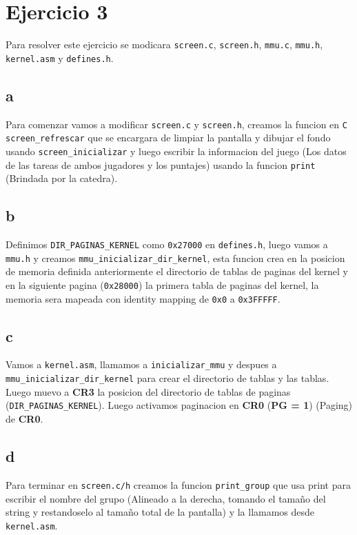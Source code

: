 \section{Ejercicio 3}

Para resolver este ejercicio se modicara \texttt{screen.c}, \texttt{screen.h}, \texttt{mmu.c}, \texttt{mmu.h}, \texttt{kernel.asm} y \texttt{defines.h}.

\subsection{a}
Para comenzar vamos a modificar \texttt{screen.c} y \texttt{screen.h}, creamos la funcion en \texttt{C} \texttt{screen\_refrescar} que se encargara de limpiar la pantalla y dibujar el fondo usando \texttt{screen\_inicializar} y luego escribir la informacion del juego (Los datos de las tareas de ambos jugadores y los puntajes) usando la funcion \texttt{print} (Brindada por la catedra).

\subsection{b}
Definimos \texttt{DIR\_PAGINAS\_KERNEL} como \texttt{0x27000} en \texttt{defines.h}, luego vamos a \texttt{mmu.h} y creamos \texttt{mmu\_inicializar\_dir\_kernel}, esta funcion crea en la posicion de memoria definida anteriormente el directorio de tablas de paginas del kernel y en la siguiente pagina (\texttt{0x28000}) la primera tabla de paginas del kernel, la memoria sera mapeada con identity mapping de \texttt{0x0} a \texttt{0x3FFFFF}.

\subsection{c}
Vamos a \texttt{kernel.asm}, llamamos a \texttt{inicializar\_mmu} y despues a \texttt{mmu\_inicializar\_dir\_kernel} para crear el directorio de tablas y las tablas. Luego muevo a \textbf{CR3} la posicion del directorio de tablas de paginas (\texttt{DIR\_PAGINAS\_KERNEL}). Luego activamos paginacion en \textbf{CR0} (\textbf{PG = 1}) (Paging) de \textbf{CR0}.

\subsection{d}
Para terminar en \texttt{screen.c/h} creamos la funcion \texttt{print\_group} que usa print para escribir el nombre del grupo (Alineado a la derecha, tomando el tamaño del string y restandoselo al tamaño total de la pantalla) y la llamamos desde \texttt{kernel.asm}.